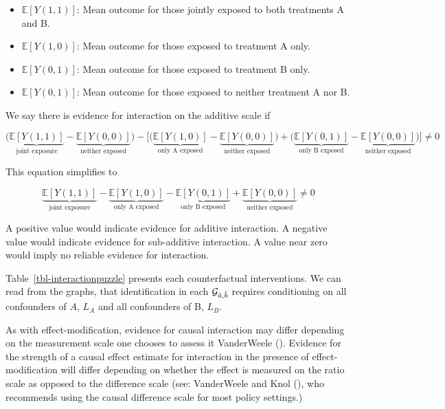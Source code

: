 \documentclass[
  single column]{article}
\providecommand{\tightlist}{%
  \setlength{\itemsep}{0pt}\setlength{\parskip}{0pt}}\usepackage{longtable,booktabs,array}
\begin{document}
\begin{itemize}
\tightlist
\item
  \(\mathbb{E}[Y(1,1)]\): Mean outcome for those jointly exposed to both
  treatments A and B.
\item
  \(\mathbb{E}[Y(1,0)]\): Mean outcome for those exposed to treatment A
  only.
\item
  \(\mathbb{E}[Y(0,1)]\): Mean outcome for those exposed to treatment B
  only.
\item
  \(\mathbb{E}[Y(0,1)]\): Mean outcome for those exposed to neither
  treatment A nor B.
\end{itemize}

We say there is evidence for interaction on the additive scale if

\[\bigg(\underbrace{\mathbb{E}[Y(1,1)]}_{\text{joint exposure}} - \underbrace{\mathbb{E}[Y(0,0)]}_{\text{neither exposed}}\bigg) - \bigg[ \bigg(\underbrace{\mathbb{E}[Y(1,0)]}_{\text{only A exposed}} - \underbrace{\mathbb{E}[Y(0,0)]}_{\text{neither exposed}}\bigg) + \bigg(\underbrace{\mathbb{E}[Y(0,1)]}_{\text{only B exposed}} - \underbrace{\mathbb{E}[Y(0,0)]}_{\text{neither exposed}} \bigg)\bigg] \neq 0 \]

This equation simplifies to

\[ \underbrace{\mathbb{E}[Y(1,1)]}_{\text{joint exposure}} - \underbrace{\mathbb{E}[Y(1,0)]}_{\text{only A exposed}} - \underbrace{\mathbb{E}[Y(0,1)]}_{\text{only B exposed}} + \underbrace{\mathbb{E}[Y(0,0)]}_{\text{neither exposed}} \neq 0 \]

A positive value would indicate evidence for additive interaction. A
negative value would indicate evidence for sub-additive interaction. A
value near zero would imply no reliable evidence for interaction.

Table~\ref{tbl-interactionpuzzle} presents each counterfactual
interventions. We can read from the graphs, that identification in each
\(\mathcal{G}_{\Tilde{a}, \Tilde{b}}\) requires conditioning on all
confounders of \(A\), \(L_A\) and all confounders of B, \(L_B\).

As with effect-modification, evidence for causal interaction may differ
depending on the measurement scale one chooses to assess it VanderWeele
(). Evidence for the strength of a
causal effect estimate for interaction in the presence of
effect-modification will differ depending on whether the effect is
measured on the ratio scale as opposed to the difference scale (see:
VanderWeele and Knol (), who
recommends using the causal difference scale for most policy settings.)
\end{document}
